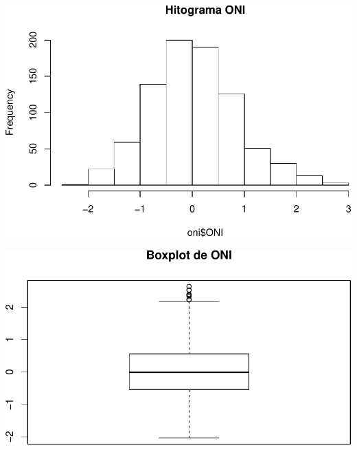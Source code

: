 \documentclass[]{book}
\newenvironment{Shaded}{\begin{snugshade}}{\end{snugshade}}
\newcommand{\DataTypeTok}[1]{\textcolor[rgb]{0.13,0.29,0.53}{#1}}
\newcommand{\KeywordTok}[1]{\textcolor[rgb]{0.13,0.29,0.53}{\textbf{#1}}}
\newcommand{\NormalTok}[1]{#1}
\newcommand{\OperatorTok}[1]{\textcolor[rgb]{0.81,0.36,0.00}{\textbf{#1}}}
\newcommand{\StringTok}[1]{\textcolor[rgb]{0.31,0.60,0.02}{#1}}
\begin{document}
\begin{Shaded}
\end{Shaded}

\includegraphics{bookdown-demo_files/figure-latex/unnamed-chunk-40-1.pdf}

\begin{Shaded}
\end{Shaded}

\includegraphics{bookdown-demo_files/figure-latex/unnamed-chunk-40-2.pdf}
\end{document}
